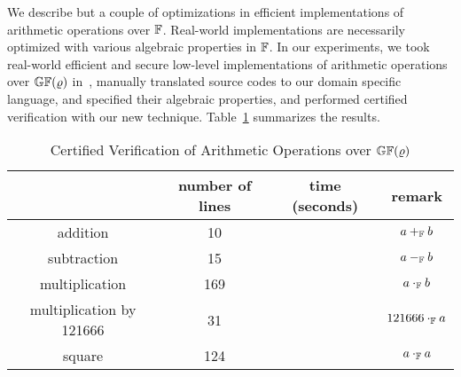 We describe but a couple of optimizations in efficient implementations
of arithmetic operations over $\mathbb{F}$. Real-world implementations
are necessarily optimized with various algebraic properties in
$\mathbb{F}$. In our experiments, we took real-world efficient and secure
low-level implementations of arithmetic operations over
$\mathbb{GF}(\varrho)$ in~, manually translated source
codes to our domain specific language, and specified their algebraic
properties, and performed certified verification with our new technique. 
Table~\ref{table:arithmetic-operations} summarizes the results.


\begin{table}[ht]
  \caption{Certified Verification of Arithmetic Operations over
    $\mathbb{GF}(\varrho)$}
  \centering
  \begin{tabular}{|c|c|c|c|}
    \hline
             & number of lines & time (seconds) & remark\\
    \hline
    addition & 10 &                       & $a +_{\mathbb{F}} b$ \\
    \hline
    subtraction & 15 &                    & $a -_{\mathbb{F}} b$ \\
    \hline
    multiplication & 169 &                & $a \cdot_{\mathbb{F}} b$\\
    \hline
    multiplication by 121666 & 31 &       & $121666 \cdot_{\mathbb{F}} a$\\
    \hline
    square & 124 &                        & $a \cdot_{\mathbb{F}} a$\\
    \hline
  \end{tabular}
  \label{table:arithmetic-operations}
\end{table}